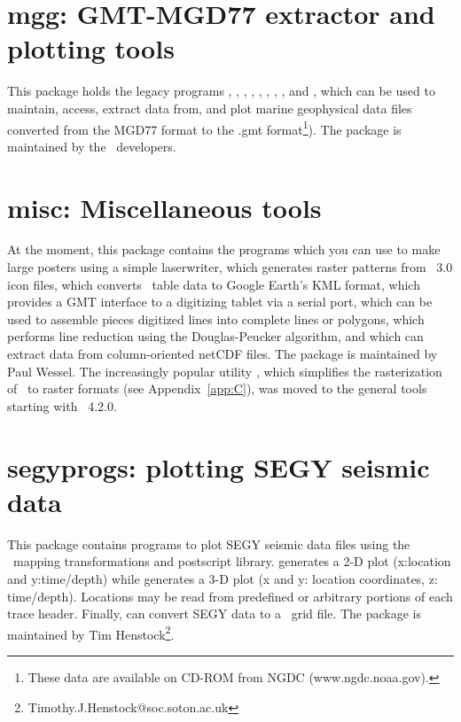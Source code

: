 \section{mgg: GMT-MGD77 extractor and plotting tools}

This package holds the legacy programs , ,
, , , ,
, , and , which can be
used to maintain, access, extract data from, and plot marine geophysical
data files converted from the MGD77 format to the .gmt format\footnote{These data are available on CD-ROM from NGDC
(www.ngdc.noaa.gov).}). The package is maintained by the \GMT\ developers.

\section{misc: Miscellaneous tools}

At the moment, this package contains the programs 
which you can use to make large posters using a simple laserwriter,
 which generates raster patterns from \GMT\ 3.0
icon files,  which converts \GMT\ table data to Google
Earth's KML format,  which provides a GMT interface
to a digitizing tablet via a serial port,  which can
be used to assemble pieces digitized lines into complete lines or
polygons,  which performs line reduction using the Douglas-Peucker algorithm,
and  which can extract data from column-oriented netCDF files.
The package is maintained by Paul Wessel.
The increasingly popular utility , which simplifies the rasterization of \GMT
\PS\ to raster formats (see Appendix~\ref{app:C}), was moved to the general tools starting with \GMT\ 4.2.0.

\section{segyprogs: plotting SEGY seismic data}

This package contains programs to plot SEGY seismic data files using
the \GMT\ mapping transformations and postscript library.  generates
a 2-D plot (x:location and y:time/depth) while  generates a
3-D plot (x and y: location coordinates, z: time/depth). Locations may be
read from predefined or arbitrary portions of each trace header.  Finally,
 can convert SEGY data to a \GMT\ grid file.
The package is maintained by Tim Henstock\footnote{Timothy.J.Henstock@soc.soton.ac.uk}.

